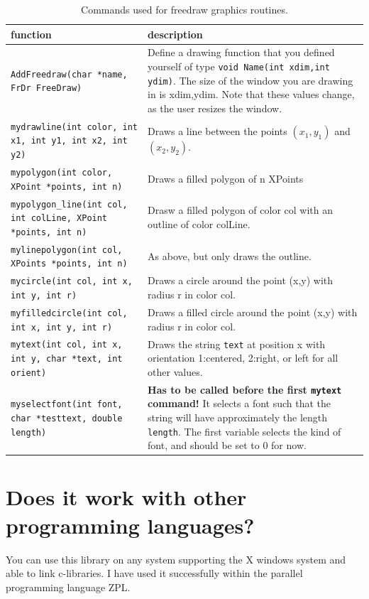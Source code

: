 \documentclass[12pt,letterpaper]{article}
\begin{document}
\begin{table}
  \begin{tabular}{|p{}|p{}|}
    \hline
    function & description\\
    \hline
    \texttt{AddFreedraw(char *name, FrDr FreeDraw)} & Define a drawing function that you defined yourself of type \texttt{void Name(int xdim,int ydim)}. The size of the window you are drawing in is xdim,ydim. Note that these values change, as the user resizes the window.\\
      \hline
      \texttt{mydrawline(int color, int x1, int y1, int x2, int y2)} & Draws a line between the points $(x_1,y_1)$ and $(x_2,y_2)$. \\
      \texttt{mypolygon(int color, XPoint *points, int n)}&Draws a filled polygon of n XPoints\\
      \texttt{mypolygon\_line(int col, int colLine, XPoint *points, int n)}& Drasw a filled polygon of color col with an outline of color colLine.\\
      \texttt{mylinepolygon(int col, XPoints *points, int n)}& As above, but only draws the outline.\\
        \texttt{mycircle(int col, int x, int y, int r)}& Draws a circle around the point (x,y) with radius r in color col.\\
        \texttt{myfilledcircle(int col, int x, int y, int r)}& Draws a filled circle around the point (x,y) with radius r in color col.\\
        \texttt{mytext(int col, int x, int y, char *text, int orient)}& Draws the string \texttt{text} at position x with orientation 1:centered, 2:right, or left for all other values.\\
      \texttt{myselectfont(int font, char *testtext, double length)} & \textbf{Has to be called before the first \texttt{mytext} command!} It selects a font such that the string will have approximately the length \texttt{length}. The first variable selects the kind of font, and should be set to 0 for now.\\
      \hline
  \end{tabular}
  \caption{Commands used for freedraw graphics routines.}
  \label{freedraw}
\end{table}

\section{Does it work with other programming languages?}
You can use this library on any system supporting the X windows system
and able to link c-libraries. I have used it successfully within the
parallel programming language ZPL.
\end{document}
